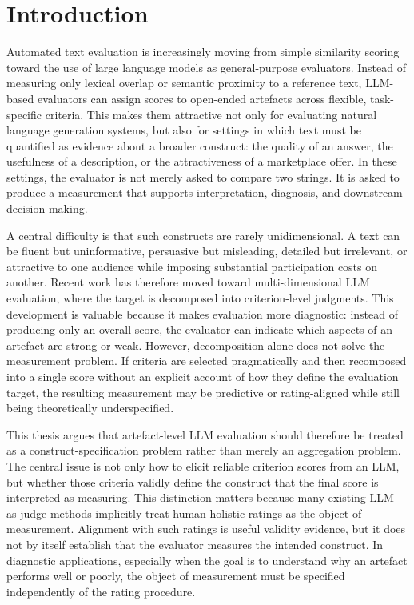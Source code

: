 
\section{Introduction}

Automated text evaluation is increasingly moving from simple similarity scoring toward the use of large language models as general-purpose evaluators. Instead of measuring only lexical overlap or semantic proximity to a reference text, LLM-based evaluators can assign scores to open-ended artefacts across flexible, task-specific criteria. This makes them attractive not only for evaluating natural language generation systems, but also for settings in which text must be quantified as evidence about a broader construct: the quality of an answer, the usefulness of a description, or the attractiveness of a marketplace offer. In these settings, the evaluator is not merely asked to compare two strings. It is asked to produce a measurement that supports interpretation, diagnosis, and downstream decision-making.

A central difficulty is that such constructs are rarely unidimensional. A text can be fluent but uninformative, persuasive but misleading, detailed but irrelevant, or attractive to one audience while imposing substantial participation costs on another. Recent work has therefore moved toward multi-dimensional LLM evaluation, where the target is decomposed into criterion-level judgments. This development is valuable because it makes evaluation more diagnostic: instead of producing only an overall score, the evaluator can indicate which aspects of an artefact are strong or weak. However, decomposition alone does not solve the measurement problem. If criteria are selected pragmatically and then recomposed into a single score without an explicit account of how they define the evaluation target, the resulting measurement may be predictive or rating-aligned while still being theoretically underspecified.

This thesis argues that artefact-level LLM evaluation should therefore be treated as a construct-specification problem rather than merely an aggregation problem. The central issue is not only how to elicit reliable criterion scores from an LLM, but whether those criteria validly define the construct that the final score is interpreted as measuring. This distinction matters because many existing LLM-as-judge methods implicitly treat human holistic ratings as the object of measurement. Alignment with such ratings is useful validity evidence, but it does not by itself establish that the evaluator measures the intended construct. In diagnostic applications, especially when the goal is to understand why an artefact performs well or poorly, the object of measurement must be specified independently of the rating procedure.

